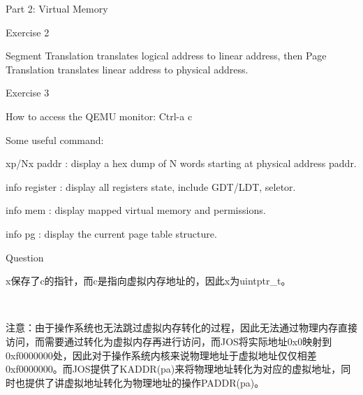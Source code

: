 \documentclass[GBK,winfonts,a4paper,10pt]{ctexart}
\begin{document}
\begin{section}{Part 2: Virtual Memory}
\begin{subsection}{Exercise 2}
\par
Segment Translation translates logical address to linear address, then Page Translation translates linear address to physical address.
\end{subsection}

\begin{subsection}{Exercise 3}
\par
How to access the QEMU monitor: Ctrl-a c 
\par
Some useful command: 
\par
xp/Nx paddr		: display a hex dump of N words starting at physical address paddr. \par
info register	: display all registers state, include GDT/LDT, seletor. \par
info mem			: display mapped virtual memory and permissions.	\par
info	 pg			: display the current page table structure.	
\end{subsection}

\begin{subsection}{Question}
\par
x保存了c的指针，而c是指向虚拟内存地址的，因此x为uintptr\_t。
\end{subsection}
\\

\par
注意：由于操作系统也无法跳过虚拟内存转化的过程，因此无法通过物理内存直接访问，而需要通过转化为虚拟内存再进行访问，而JOS将实际地址0x0映射到0xf0000000处，因此对于操作系统内核来说物理地址于虚拟地址仅仅相差0xf0000000。而JOS提供了KADDR(pa)来将物理地址转化为对应的虚拟地址，同时也提供了讲虚拟地址转化为物理地址的操作PADDR(pa)。


\end{section}
\end{document}
